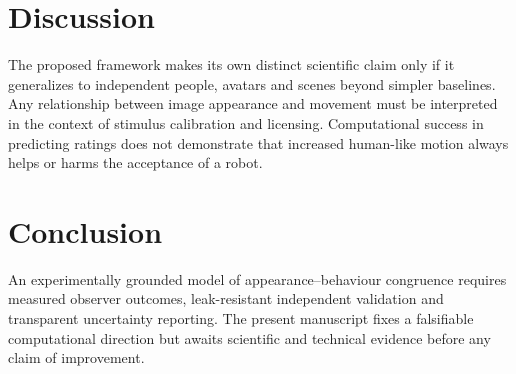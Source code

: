 \documentclass[11pt,a4paper]{article}
\begin{document}
\section{Discussion}
The proposed framework makes its own distinct scientific claim only if it generalizes to independent people, avatars and scenes beyond simpler baselines. Any relationship between image appearance and movement must be interpreted in the context of stimulus calibration and licensing. Computational success in predicting ratings does not demonstrate that increased human-like motion always helps or harms the acceptance of a robot.
\section{Conclusion}
An experimentally grounded model of appearance--behaviour congruence requires measured observer outcomes, leak-resistant independent validation and transparent uncertainty reporting. The present manuscript fixes a falsifiable computational direction but awaits scientific and technical evidence before any claim of improvement.
\end{document}
